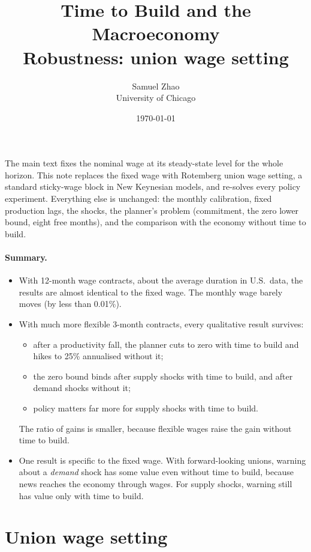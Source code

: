 \documentclass[11pt]{article}
\title{Time to Build and the Macroeconomy\\[0.3em]\large Robustness: union wage setting}
\author{Samuel Zhao\\University of Chicago}
\date{\today}
\begin{document}
\maketitle

\noindent The main text fixes the nominal wage at its steady-state level for the whole horizon. This
note replaces the fixed wage with Rotemberg union wage setting, a standard sticky-wage block in New
Keynesian models, and re-solves every policy experiment. Everything else is unchanged: the monthly
calibration, fixed production lags, the shocks, the planner's problem (commitment, the zero lower
bound, eight free months), and the comparison with the economy without time to build.

\paragraph{Summary.}
\begin{itemize}
  \item With 12-month wage contracts, about the average duration in U.S.\ data, the results are almost
        identical to the fixed wage. The monthly wage barely moves (by less than 0.01\%).
  \item With much more flexible 3-month contracts, every qualitative result survives:
        \begin{itemize}
          \item after a productivity fall, the planner cuts to zero with time to build and hikes to
                25\% annualised without it;
          \item the zero bound binds after supply shocks with time to build, and after demand shocks
                without it;
          \item policy matters far more for supply shocks with time to build.
        \end{itemize}
        The ratio of gains is smaller, because flexible wages raise the gain without time to build.
  \item One result is specific to the fixed wage. With forward-looking unions, warning about a
        \emph{demand} shock has some value even without time to build, because news reaches the economy
        through wages. For supply shocks, warning still has value only with time to build.
\end{itemize}

\section{Union wage setting}
\end{document}
